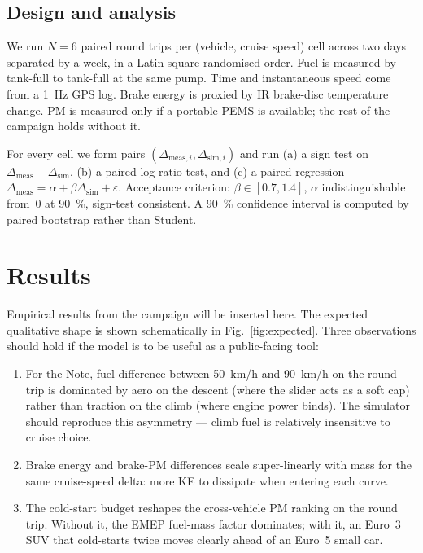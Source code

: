 \documentclass[11pt,a4paper]{article}
\begin{document}
\subsection{Design and analysis}

We run $N=6$ paired round trips per (vehicle, cruise speed) cell
across two days separated by a week, in a Latin-square-randomised
order. Fuel is measured by tank-full to tank-full at the same pump.
Time and instantaneous speed come from a \SI{1}{Hz} GPS log. Brake
energy is proxied by IR brake-disc temperature change. PM is measured
only if a portable PEMS is available; the rest of the campaign holds
without it.

For every cell we form pairs $(\Delta_{\text{meas},i},
\Delta_{\text{sim},i})$ and run (a) a sign test on
$\Delta_{\text{meas}} - \Delta_{\text{sim}}$, (b) a paired
log-ratio test, and (c) a paired regression
$\Delta_{\text{meas}} = \alpha + \beta \Delta_{\text{sim}} +
\varepsilon$. Acceptance criterion: $\beta \in [0.7, 1.4]$, $\alpha$
indistinguishable from~$0$ at \SI{90}{\percent}, sign-test consistent.
A 90~\% confidence interval is computed by paired bootstrap rather
than Student.

\section{Results}\label{sec:results}

Empirical results from the campaign will be inserted here. The
expected qualitative shape is shown schematically in
Fig.~\ref{fig:expected}. Three observations should hold if the model
is to be useful as a public-facing tool:

\begin{enumerate}
  \item For the Note, fuel difference between \SI{50}{km/h} and
        \SI{90}{km/h} on the round trip is dominated by aero on the
        descent (where the slider acts as a soft cap) rather than
        traction on the climb (where engine power binds). The
        simulator should reproduce this asymmetry --- climb fuel is
        relatively insensitive to cruise choice.
  \item Brake energy and brake-PM differences scale super-linearly
        with mass for the same cruise-speed delta: more KE to
        dissipate when entering each curve.
  \item The cold-start budget reshapes the cross-vehicle PM ranking
        on the round trip. Without it, the EMEP fuel-mass factor
        dominates; with it, an Euro~3 SUV that cold-starts twice
        moves clearly ahead of an Euro~5 small car.
\end{enumerate}
\end{document}
